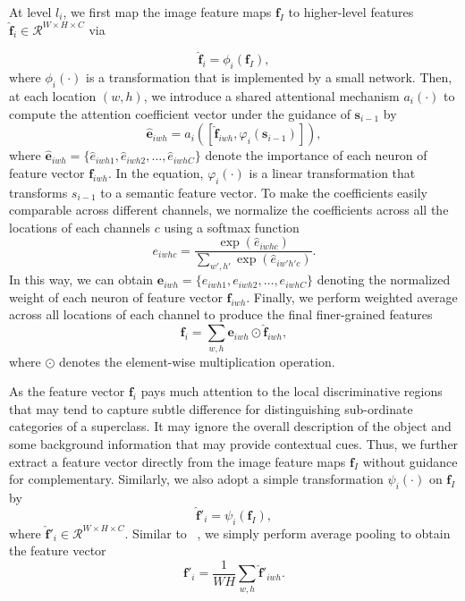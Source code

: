 \documentclass[sigconf]{acmart}
\begin{document}
At level $l_i$, we first map the image feature maps $\mathbf{f}_I$ to higher-level features $\hat{\mathbf{f}}_i \in \mathcal{R}^{W \times H \times C}$ via

\begin{equation}
    \hat{\mathbf{f}}_i=\phi_i(\mathbf{f}_I),
\end{equation}
where $\phi_i(\cdot)$ is a transformation that is implemented by a small network. Then, at each location $(w, h)$, we introduce a shared attentional mechanism $a_i(\cdot)$ to compute the attention coefficient vector under the guidance of $\mathbf{s}_{i-1}$ by
\begin{equation}
   \hat{\mathbf{e}}_{iwh}=a_i([\hat{\mathbf{f}}_{iwh}, \varphi_i(\mathbf{s}_{{i-1}})]),
\end{equation}
where $\hat{\mathbf{e}}_{iwh}=\{\hat{e}_{iwh1}, \hat{e}_{iwh2}, \dots, \hat{e}_{iwhC}\}$ denote the importance of each neuron of feature vector $\mathbf{f}_{iwh}$. In the equation, $\varphi_i(\cdot)$ is a linear transformation that transforms $s_{i-1}$ to a semantic feature vector. To make the coefficients easily comparable across different channels, we normalize the coefficients across all the locations of each channels $c$ using a softmax function
\begin{equation}
    e_{iwhc}=\frac{\exp(\hat{e}_{iwhc})}{\sum_{w', h'}{\exp(\hat{e}_{iw'h'c})}}.
\end{equation}
In this way, we can obtain $\mathbf{e}_{iwh}=\{e_{iwh1}, e_{iwh2}, \dots, e_{iwhC}\}$ denoting the normalized weight of each neuron of feature vector $\mathbf{f}_{iwh}$. Finally, we perform weighted average across all locations of each channel to produce the final finer-grained features
\begin{equation}
    \mathbf{f}_i=\sum_{w,h}{\mathbf{e}_{iwh} \odot \hat{\mathbf{f}}_{iwh}},
\end{equation}
where $\odot$ denotes the element-wise multiplication operation. 

As the feature vector $\mathbf{f}_i$ pays much attention to the local discriminative regions that may tend to capture subtle difference for distinguishing sub-ordinate categories of a superclass. It may ignore the overall description of the object and some background information that may provide contextual cues. Thus, we further extract a feature vector directly from the image feature maps $\mathbf{f}_I$ without guidance for complementary. Similarly, we also adopt a simple transformation $\psi_i(\cdot)$ on $\mathbf{f}_I$ by
\begin{equation}
    \hat{\mathbf{f}}'_i=\psi_i(\mathbf{f}_I),
\end{equation}
where $\hat{\mathbf{f}}'_i \in \mathcal{R}^{W \times H \times C}$. Similar to ~\cite{he2016deep}, we simply perform average pooling to obtain the feature vector 
\begin{equation}
    \mathbf{f}'_i=\frac{1}{WH}\sum_{w,h}{\hat{\mathbf{f}}'_{iwh}}.
\end{equation}
\end{document}
